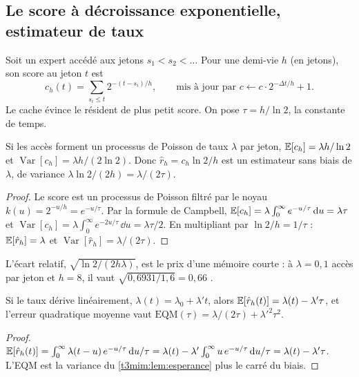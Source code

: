 \subsection{Le score à décroissance exponentielle, estimateur de taux}\label{t3mim:sec:p1-score}

\begin{definition}\label{t3mim:def:score}
Soit un expert accédé aux jetons $s_1 < s_2 < \dots$ Pour une demi-vie $h$ (en jetons), son score au jeton $t$ est
\begin{equation}\label{t3mim:eq:score}
c_h(t) = \sum_{s_i \le t} 2^{-(t - s_i)/h}, \qquad \text{mis à jour par } c \leftarrow c \cdot 2^{-\Delta t / h} + 1 .
\end{equation}
Le cache évince le résident de plus petit score. On pose $\tau = h / \ln 2$, la constante de temps.
\end{definition}

\begin{lemme}\label{t3mim:lem:esperance}
Si les accès forment un processus de Poisson de taux $\lambda$ par jeton, $\mathbb{E}[c_h] = \lambda h / \ln 2$ et $\operatorname{Var}[c_h] = \lambda h / (2\ln 2)$. Donc $\hat r_h = c_h \ln 2 / h$ est un estimateur sans biais de $\lambda$, de variance $\lambda \ln 2 / (2h) = \lambda/(2\tau)$.
\end{lemme}
\begin{proof}
Le score est un processus de Poisson filtré par le noyau $k(u) = 2^{-u/h} = e^{-u/\tau}$. Par la formule de Campbell, $\mathbb{E}[c_h] = \lambda \int_0^\infty e^{-u/\tau}\,\mathrm{d} u = \lambda\tau$ et $\operatorname{Var}[c_h] = \lambda \int_0^\infty e^{-2u/\tau}\,\dd u = \lambda\tau/2$. En multipliant par $\ln 2/h = 1/\tau$ : $\mathbb{E}[\hat r_h] = \lambda$ et $\operatorname{Var}[\hat r_h] = \lambda/(2\tau)$.
\end{proof}
L'écart relatif, $\sqrt{\ln 2 / (2h\lambda)}$, est le prix d'une mémoire courte : à $\lambda = 0{,}1$ accès par jeton et $h = 8$, il vaut $\sqrt{0{,}6931/1{,}6} = 0{,}66$ \calc.

\begin{lemme}\label{t3mim:lem:retard}
Si le taux dérive linéairement, $\lambda(t) = \lambda_0 + \lambda' t$, alors $\mathbb{E}[\hat r_h(t)] = \lambda(t) - \lambda'\tau$, et l'erreur quadratique moyenne vaut $\mathrm{EQM}(\tau) = \lambda/(2\tau) + \lambda'^2\tau^2$.
\end{lemme}
\begin{proof}
$\mathbb{E}[\hat r_h(t)] = \int_0^\infty \lambda(t-u)\,e^{-u/\tau}\,\mathrm{d} u/\tau = \lambda(t) - \lambda' \int_0^\infty u\,e^{-u/\tau}\,\mathrm{d} u/\tau = \lambda(t) - \lambda'\tau$. L'EQM est la variance du \cref{t3mim:lem:esperance} plus le carré du biais.
\end{proof}


